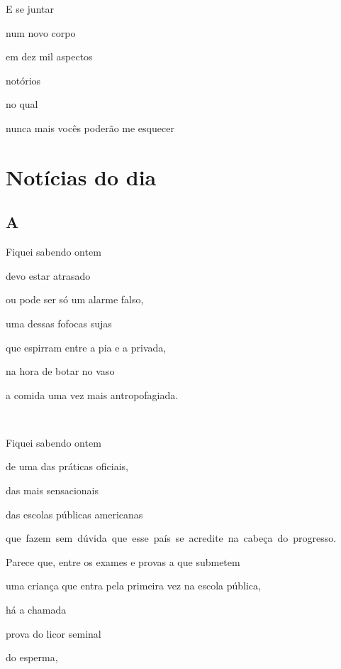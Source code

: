 
E se juntar

num novo corpo

em dez mil aspectos

notórios

no qual

nunca mais vocês poderão me esquecer

\chapter{Notícias do dia}


\section*{A}



Fiquei sabendo ontem

devo estar atrasado

ou pode ser só um alarme falso,

uma dessas fofocas sujas

que espirram entre a pia e a privada, 

na hora de botar no vaso

a comida uma vez mais antropofagiada.

~

Fiquei sabendo ontem

de uma das práticas oficiais, 

das mais sensacionais

das escolas públicas americanas

\mbox{que fazem sem dúvida que esse país se acredite na cabeça do progresso.}

Parece que, entre os exames e provas a que submetem

uma criança que entra pela primeira vez na escola pública, 

há a chamada \EP[3]

prova do licor seminal

do esperma,


